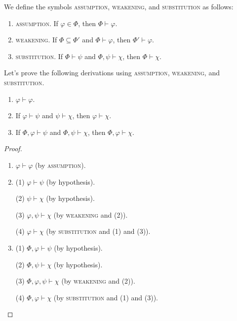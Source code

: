 \begin{definition}
    We define the symbols \textsc{assumption}, \textsc{weakening}, and \textsc{substitution} as follows:
    \begin{enumerate}[itemindent=0ex, itemsep=0pt, label=\upshape{(\alph*)}]
        \item \textsc{assumption}. If $\varphi\in\Phi$, then $\Phi\vdash\varphi$.
        \item \textsc{weakening}. If $\Phi\subseteq\Phi'$ and $\Phi\vdash\varphi$, then $\Phi'\vdash\varphi$.
        \item \textsc{substitution}. If $\Phi\vdash\psi$ and $\Phi,\psi\vdash\chi$, then $\Phi\vdash\chi$.
    \end{enumerate}
\end{definition}

\begin{example}
    Let's prove the following derivations using \textsc{assumption}, \textsc{weakening}, and \textsc{substitution}. 
    \begin{enumerate}[itemindent=0ex, itemsep=0pt, label=\upshape{(\alph*)}]
        \item $\varphi\vdash\varphi$.
        \item If $\varphi\vdash\psi$ and $\psi\vdash\chi$, then $\varphi\vdash\chi$.
        \item If $\Phi, \varphi\vdash\psi$ and $\Phi, \psi\vdash\chi$, then $\Phi, \varphi\vdash\chi$.
    \end{enumerate}
\end{example}

\begin{proof}
    \begin{enumerate}[itemindent=0ex, itemsep=0pt, label=\upshape{(\alph*)}]
        \item $\varphi\vdash\varphi$ (by \textsc{assumption}).
        \item (1) $\varphi\vdash\psi$ (by hypothesis). 
        
        (2) $\psi\vdash\chi$ (by hypothesis). 
        
        (3) $\varphi, \psi\vdash\chi$ (by \textsc{weakening} and (2)). 
        
        (4) $\varphi\vdash\chi$ (by \textsc{substitution} and (1) and (3)).
        \item (1) $\Phi, \varphi\vdash\psi$ (by hypothesis). 
        
        (2) $\Phi, \psi\vdash\chi$ (by hypothesis). 
        
        (3) $\Phi, \varphi, \psi\vdash\chi$ (by \textsc{weakening} and (2)). 
        
        (4) $\Phi, \varphi\vdash\chi$ (by \textsc{substitution} and (1) and (3)).
    \end{enumerate}
\end{proof}

